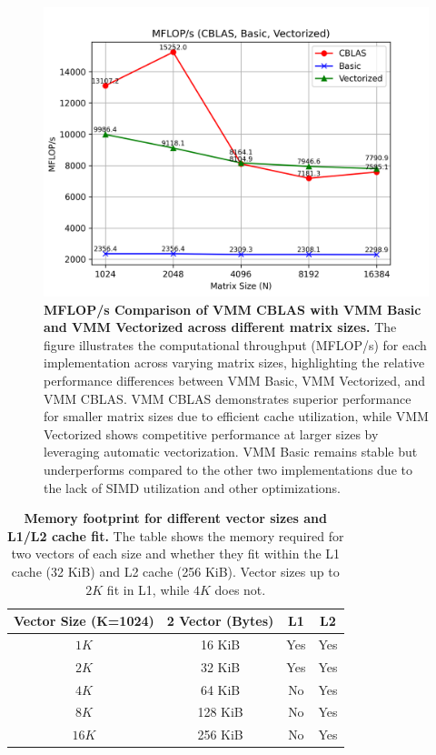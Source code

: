 \begin{figure}[htbp]
    \centering
    \includegraphics[width=1.0\linewidth]{images/MFLOPs-serial.png}
    \caption{\textbf{MFLOP/s Comparison of VMM CBLAS with VMM Basic and VMM Vectorized across different matrix sizes.} The figure illustrates the computational throughput (MFLOP/s) for each implementation across varying matrix sizes, highlighting the relative performance differences between VMM Basic, VMM Vectorized, and VMM CBLAS. VMM CBLAS demonstrates superior performance for smaller matrix sizes due to efficient cache utilization, while VMM Vectorized shows competitive performance at larger sizes by leveraging automatic vectorization. VMM Basic remains stable but underperforms compared to the other two implementations due to the lack of SIMD utilization and other optimizations.}
    \label{fig:mflops-serial}
\end{figure}

\begin{table}[htbp]
    \centering
    \begin{tabular}{c|c|c|c}
        \textbf{Vector Size (K=1024)} & \textbf{2 Vector (Bytes)} & \textbf{L1} & \textbf{L2} \\
        \hline
        \(1K\) & 16 KiB& Yes & Yes\\
        \(2K\)  & 32 KiB& Yes & Yes\\
        \(4K\)  & 64 KiB& No & Yes\\
        \(8K\)  & 128 KiB& No & Yes\\
        \(16K\)  & 256 KiB& No & Yes\\
    \end{tabular}
    \caption{\textbf{Memory footprint for different vector sizes and L1/L2 cache fit.} The table shows the memory required for two vectors of each size and whether they fit within the L1 cache (32 KiB) and L2 cache (256 KiB). Vector sizes up to \(2K\) fit in L1, while \(4K\) does not.}
    \label{tab:memory-footprint-two-vectors}
\end{table}

